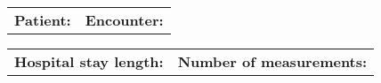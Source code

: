 \begin{multicols}{3}

\begin{tabular}{ll}
    \textbf{Patient:} & %
    \textbf{Encounter:} & %
\end{tabular}

\columnbreak

\begin{tabular}{ll}
    \textbf{Hospital stay length:} & %
    \textbf{Number of measurements:} & %
\end{tabular}

\end{multicols}